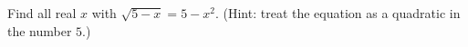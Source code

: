 Find all real $x$ with $\sqrt{5-x}=5-x^2$. (Hint: treat the equation as a quadratic in the number $5$.)
